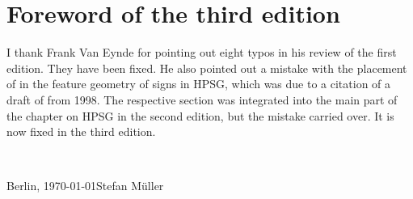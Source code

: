 
\section*{Foreword of the third edition}







I thank Frank Van Eynde for pointing out eight typos in his review of the first edition. They have
been fixed. He also pointed out a mistake with the placement of \argst in the feature geometry of
signs in HPSG, which was due to a citation of a draft of  from 1998. The respective
section was integrated into the main part of the chapter on HPSG in the second edition, but the
mistake carried over. It is now fixed in the third edition.

~\medskip

\noindent
Berlin, \today\hfill Stefan Müller



